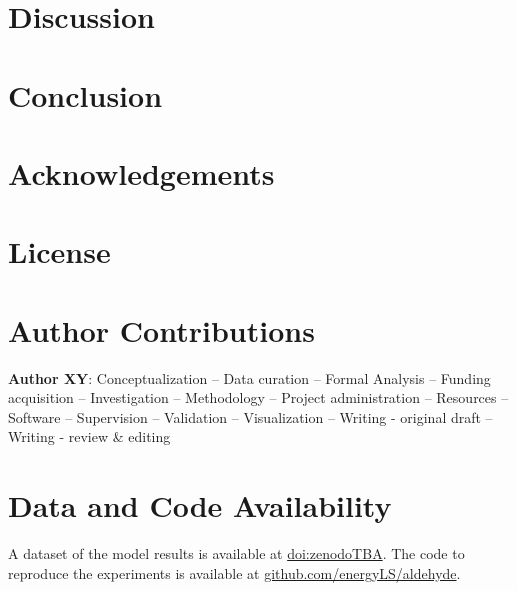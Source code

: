 \documentclass[5p]{elsarticle}
\begin{document}


\section{Discussion}
\label{sec:discussion}



\section{Conclusion}
\label{sec:conclusion}



\section*{Acknowledgements}


\section*{License}

\section*{Author Contributions}


\textbf{Author XY}:
Conceptualization --
Data curation --
Formal Analysis --
Funding acquisition --
Investigation --
Methodology --
Project administration --
Resources --
Software --
Supervision --
Validation --
Visualization --
Writing - original draft --
Writing - review \& editing


\section*{Data and Code Availability}

A dataset of the model results is available at \href{zenodoTBA}{doi:zenodoTBA}.
The code to reproduce the experiments is available at \href{https://github.com/energyLS/aldehyde}{github.com/energyLS/aldehyde}.



\renewcommand{\ttdefault}{\sfdefault}

\end{document}
